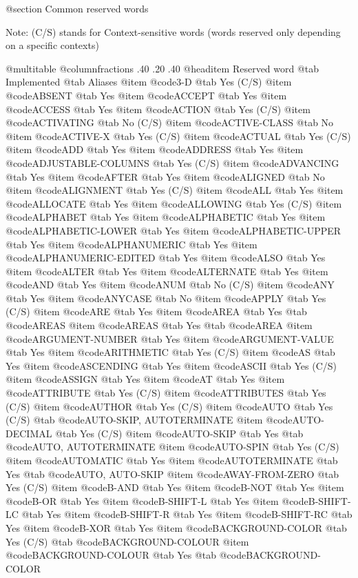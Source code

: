 @section Common reserved words

Note: (C/S) stands for Context-sensitive words (words reserved only
depending on a specific contexts)

@multitable @columnfractions .40 .20 .40
@headitem Reserved word @tab Implemented @tab Aliases
@item @code{3-D} @tab Yes (C/S)
@item @code{ABSENT} @tab Yes
@item @code{ACCEPT} @tab Yes
@item @code{ACCESS} @tab Yes
@item @code{ACTION} @tab Yes (C/S)
@item @code{ACTIVATING} @tab No (C/S)
@item @code{ACTIVE-CLASS} @tab No
@item @code{ACTIVE-X} @tab Yes (C/S)
@item @code{ACTUAL} @tab Yes (C/S)
@item @code{ADD} @tab Yes
@item @code{ADDRESS} @tab Yes
@item @code{ADJUSTABLE-COLUMNS} @tab Yes (C/S)
@item @code{ADVANCING} @tab Yes
@item @code{AFTER} @tab Yes
@item @code{ALIGNED} @tab No
@item @code{ALIGNMENT} @tab Yes (C/S)
@item @code{ALL} @tab Yes
@item @code{ALLOCATE} @tab Yes
@item @code{ALLOWING} @tab Yes (C/S)
@item @code{ALPHABET} @tab Yes
@item @code{ALPHABETIC} @tab Yes
@item @code{ALPHABETIC-LOWER} @tab Yes
@item @code{ALPHABETIC-UPPER} @tab Yes
@item @code{ALPHANUMERIC} @tab Yes
@item @code{ALPHANUMERIC-EDITED} @tab Yes
@item @code{ALSO} @tab Yes
@item @code{ALTER} @tab Yes
@item @code{ALTERNATE} @tab Yes
@item @code{AND} @tab Yes
@item @code{ANUM} @tab No (C/S)
@item @code{ANY} @tab Yes
@item @code{ANYCASE} @tab No
@item @code{APPLY} @tab Yes (C/S)
@item @code{ARE} @tab Yes
@item @code{AREA} @tab Yes @tab @code{AREAS}
@item @code{AREAS} @tab Yes @tab @code{AREA}
@item @code{ARGUMENT-NUMBER} @tab Yes
@item @code{ARGUMENT-VALUE} @tab Yes
@item @code{ARITHMETIC} @tab Yes (C/S)
@item @code{AS} @tab Yes
@item @code{ASCENDING} @tab Yes
@item @code{ASCII} @tab Yes (C/S)
@item @code{ASSIGN} @tab Yes
@item @code{AT} @tab Yes
@item @code{ATTRIBUTE} @tab Yes (C/S)
@item @code{ATTRIBUTES} @tab Yes (C/S)
@item @code{AUTHOR} @tab Yes (C/S)
@item @code{AUTO} @tab Yes (C/S) @tab @code{AUTO-SKIP, AUTOTERMINATE}
@item @code{AUTO-DECIMAL} @tab Yes (C/S)
@item @code{AUTO-SKIP} @tab Yes @tab @code{AUTO, AUTOTERMINATE}
@item @code{AUTO-SPIN} @tab Yes (C/S)
@item @code{AUTOMATIC} @tab Yes
@item @code{AUTOTERMINATE} @tab Yes @tab @code{AUTO, AUTO-SKIP}
@item @code{AWAY-FROM-ZERO} @tab Yes (C/S)
@item @code{B-AND} @tab Yes
@item @code{B-NOT} @tab Yes
@item @code{B-OR} @tab Yes
@item @code{B-SHIFT-L} @tab Yes
@item @code{B-SHIFT-LC} @tab Yes
@item @code{B-SHIFT-R} @tab Yes
@item @code{B-SHIFT-RC} @tab Yes
@item @code{B-XOR} @tab Yes
@item @code{BACKGROUND-COLOR} @tab Yes (C/S) @tab @code{BACKGROUND-COLOUR}
@item @code{BACKGROUND-COLOUR} @tab Yes @tab @code{BACKGROUND-COLOR}
